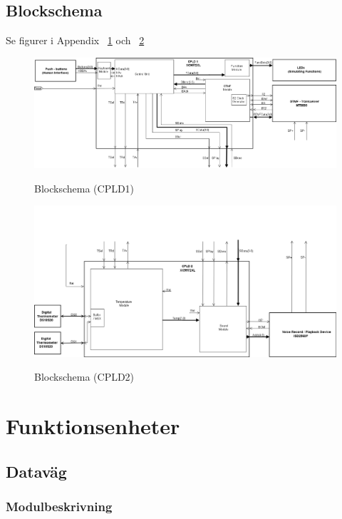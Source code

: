 \documentclass[a4paper,11pt]{article}
\begin{document}
	\subsection{Blockschema}

	Se figurer i Appendix ~\ref{fig:BlockDiagram1} och ~\ref{fig:BlockDiagram2}

	\begin{figure}[ht!]
	  \centering
	      \includegraphics[scale=0.48, angle=90]{BlockDiagramCPLD1.png}
		\label{fig:BlockDiagram1}
	  	\caption{Blockschema (CPLD1)}
	\end{figure}

	\begin{figure}[ht!]
	  \centering
	      \includegraphics[scale=0.48, angle=90]{BlockDiagramCPLD2.png}
		\label{fig:BlockDiagram2}
	  	\caption{Blockschema (CPLD2)}
	\end{figure}

\section{Funktionsenheter}

	\subsection{Dataväg}

	\subsubsection{Modulbeskrivning}
\end{document}
